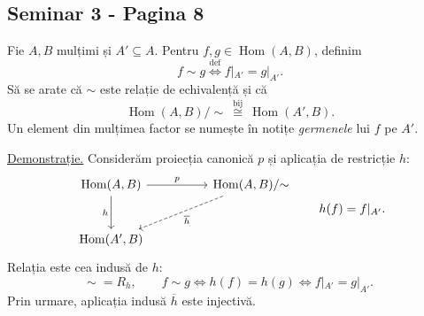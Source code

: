 
\subsection*{Seminar 3 - Pagina 8}
\begingroup
\setlength{\abovedisplayskip}{5pt}
\setlength{\belowdisplayskip}{5pt}
\setlength{\abovedisplayshortskip}{3pt}
\setlength{\belowdisplayshortskip}{3pt}

Fie $A,B$ mulțimi și $A'\subseteq A$.
Pentru $f,g\in\operatorname{Hom}(A,B)$, definim
\[
 f\sim g\overset{\mathrm{def}}\iff f|_{A'}=g|_{A'}.
\]
Să se arate că $\sim$ este relație de echivalență și că
\[
 \operatorname{Hom}(A,B)/{\sim}
 \ \overset{\mathrm{bij}}{\cong}\ \operatorname{Hom}(A',B).
\]
Un element din mulțimea factor se numește în notițe
\emph{germenele} lui $f$ pe $A'$.

\medskip
\noindent\underline{Demonstrație.}
Considerăm proiecția canonică $p$ și aplicația de restricție $h$:
\[
\begin{tikzcd}[column sep=huge,row sep=large]
 \operatorname{Hom}(A,B)
    \arrow[r,"p"]\arrow[d,"h"']
  & \operatorname{Hom}(A,B)/{\sim}
       \arrow[dl,dashed,"\overline h"] \\
 \operatorname{Hom}(A',B) &
\end{tikzcd}
\qquad h(f)=f|_{A'}.
\]
Relația este cea indusă de $h$:
\[
 \sim\;=R_h,
 \qquad f\sim g\iff h(f)=h(g)
 \iff f|_{A'}=g|_{A'}.
\]
Prin urmare, aplicația indusă $\overline h$ este injectivă.


